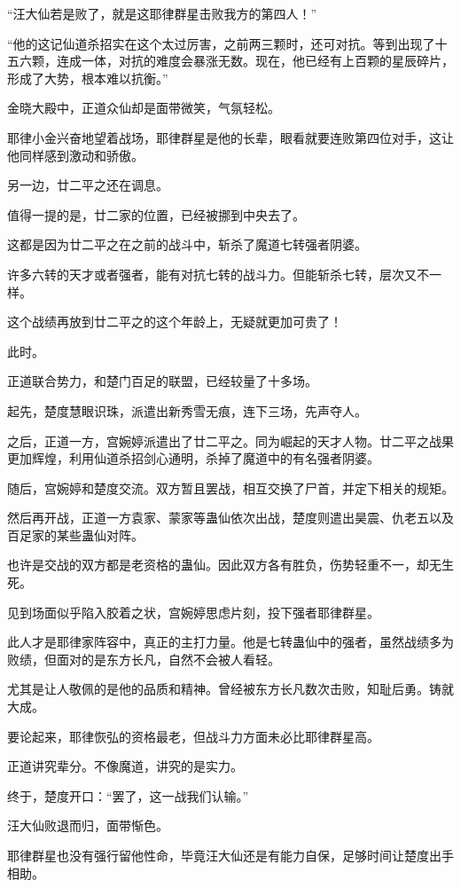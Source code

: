 \begin{this_body}
“汪大仙若是败了，就是这耶律群星击败我方的第四人！”

“他的这记仙道杀招实在这个太过厉害，之前两三颗时，还可对抗。等到出现了十五六颗，连成一体，对抗的难度会暴涨无数。现在，他已经有上百颗的星辰碎片，形成了大势，根本难以抗衡。”

金晓大殿中，正道众仙却是面带微笑，气氛轻松。

耶律小金兴奋地望着战场，耶律群星是他的长辈，眼看就要连败第四位对手，这让他同样感到激动和骄傲。

另一边，廿二平之还在调息。

值得一提的是，廿二家的位置，已经被挪到中央去了。

这都是因为廿二平之在之前的战斗中，斩杀了魔道七转强者阴婆。

许多六转的天才或者强者，能有对抗七转的战斗力。但能斩杀七转，层次又不一样。

这个战绩再放到廿二平之的这个年龄上，无疑就更加可贵了！

此时。

正道联合势力，和楚门百足的联盟，已经较量了十多场。

起先，楚度慧眼识珠，派遣出新秀雪无痕，连下三场，先声夺人。

之后，正道一方，宫婉婷派遣出了廿二平之。同为崛起的天才人物。廿二平之战果更加辉煌，利用仙道杀招剑心通明，杀掉了魔道中的有名强者阴婆。

随后，宫婉婷和楚度交流。双方暂且罢战，相互交换了尸首，并定下相关的规矩。

然后再开战，正道一方袁家、蒙家等蛊仙依次出战，楚度则遣出昊震、仇老五以及百足家的某些蛊仙对阵。

也许是交战的双方都是老资格的蛊仙。因此双方各有胜负，伤势轻重不一，却无生死。

见到场面似乎陷入胶着之状，宫婉婷思虑片刻，投下强者耶律群星。

此人才是耶律家阵容中，真正的主打力量。他是七转蛊仙中的强者，虽然战绩多为败绩，但面对的是东方长凡，自然不会被人看轻。

尤其是让人敬佩的是他的品质和精神。曾经被东方长凡数次击败，知耻后勇。铸就大成。

要论起来，耶律恢弘的资格最老，但战斗力方面未必比耶律群星高。

正道讲究辈分。不像魔道，讲究的是实力。

终于，楚度开口：“罢了，这一战我们认输。”

汪大仙败退而归，面带惭色。

耶律群星也没有强行留他性命，毕竟汪大仙还是有能力自保，足够时间让楚度出手相助。


\end{this_body}
